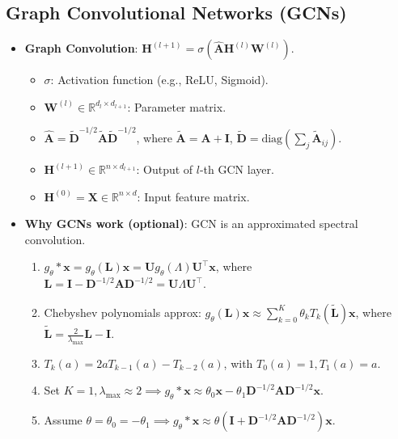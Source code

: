 \documentclass[UTF8]{ctexart}
\begin{document}
\subsection{Graph Convolutional Networks (GCNs)}
\begin{itemize}
    \item \textbf{Graph Convolution}: $\mathbf{H}^{(l+1)} = \sigma(\mathbf{\hat{A}}\mathbf{H}^{(l)}\mathbf{W}^{(l)})$.
    \begin{itemize}
        \item $\sigma$: Activation function (e.g., ReLU, Sigmoid).
        \item $\mathbf{W}^{(l)} \in \mathbb{R}^{d_l \times d_{l+1}}$: Parameter matrix.
        \item $\mathbf{\hat{A}} = \tilde{\mathbf{D}}^{-1/2}\tilde{\mathbf{A}}\tilde{\mathbf{D}}^{-1/2}$, where $\tilde{\mathbf{A}} = \mathbf{A} + \mathbf{I}$, $\tilde{\mathbf{D}} = \text{diag}(\sum_j \tilde{\mathbf{A}}_{ij})$.
        \item $\mathbf{H}^{(l+1)} \in \mathbb{R}^{n \times d_{l+1}}$: Output of $l$-th GCN layer.
        \item $\mathbf{H}^{(0)} = \mathbf{X} \in \mathbb{R}^{n \times d}$: Input feature matrix.
    \end{itemize}
    \item \textbf{Why GCNs work (optional)}: GCN is an approximated spectral convolution.
    \begin{enumerate}
        \item $g_\theta * \mathbf{x} = g_\theta(\mathbf{L})\mathbf{x} = \mathbf{U}g_\theta(\Lambda)\mathbf{U}^\top \mathbf{x}$, where $\mathbf{L} = \mathbf{I} - \mathbf{D}^{-1/2}\mathbf{A}\mathbf{D}^{-1/2} = \mathbf{U}\Lambda\mathbf{U}^\top$.
        \item Chebyshev polynomials approx: $g_\theta(\mathbf{L})\mathbf{x} \approx \sum_{k=0}^K \theta_k T_k(\tilde{\mathbf{L}})\mathbf{x}$, where $\tilde{\mathbf{L}} = \frac{2}{\lambda_{\text{max}}}\mathbf{L} - \mathbf{I}$.
        \item $T_k(a) = 2a T_{k-1}(a) - T_{k-2}(a)$, with $T_0(a)=1, T_1(a)=a$.
        \item Set $K=1, \lambda_{\text{max}} \approx 2 \implies g_\theta * \mathbf{x} \approx \theta_0 \mathbf{x} - \theta_1 \mathbf{D}^{-1/2}\mathbf{A}\mathbf{D}^{-1/2}\mathbf{x}$.
        \item Assume $\theta = \theta_0 = -\theta_1 \implies g_\theta * \mathbf{x} \approx \theta(\mathbf{I} + \mathbf{D}^{-1/2}\mathbf{A}\mathbf{D}^{-1/2})\mathbf{x}$.

\end{enumerate}
\end{itemize}
\end{document}
